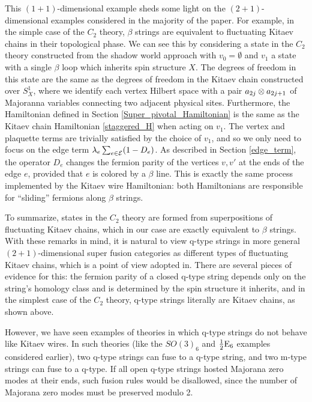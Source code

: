 This $(1+1)$-dimensional example sheds some light on the $(2+1)$-dimensional examples 
considered in the majority of the paper. For example, in the simple case of the $C_2$ theory, 
$\beta$ strings are equivalent to fluctuating Kitaev chains in their topological phase. 
We can see this by considering a state in the $C_2$ theory constructed 
from the shadow world approach with $v_0 = \emptyset$ and $v_1$ a state 
with a single $\beta$ loop which inherits spin structure $X$. 
The degrees of freedom in this state are the same as 
the degrees of freedom in the Kitaev chain constructed over $S^1_X$, 
where we identify each vertex Hilbert space with a pair $a_{2j}\otimes a_{2j+1}$ of Majoranna
variables connecting two adjacent physical sites. 
Furthermore, the Hamiltonian defined in Section \ref{Super_pivotal_Hamiltonian} is the same as the Kitaev 
chain Hamiltonian \eqref{staggered_H} when acting on $v_1$. 
The vertex and plaquette terms are trivially satisfied by the choice of $v_1$, and so we only need to focus 
on the edge term $\lambda_e \sum_{e\in \mathcal{E}} (1-D_e)$. As described in Section \ref{edge_term}, 
the operator $D_e$ changes the fermion parity of the vertices $v,v'$ at the ends of the edge $e$, provided
that $e$ is colored by a $\beta$ line. 
This is exactly the same process implemented by the Kitaev wire Hamiltonian: both Hamiltonians
 are responsible for ``sliding'' fermions along $\beta$ strings.  

To summarize, states in the $C_2$ theory are formed from superpositions of fluctuating Kitaev chains, which in our case are exactly equivalent to $\beta$ strings. 
With these remarks in mind, it 
is natural to view q-type strings in more general $(2+1)$-dimensional super fusion categories 
as different types of fluctuating Kitaev chains, which is a point of view adopted in\cite{tarantino2016,ware2016,kapustin2017}. 
There are several pieces of evidence for this: the fermion parity of a closed q-type string 
depends only on the string's homology class and is determined by the spin structure it inherits, 
and in the simplest case of the $C_2$ theory, q-type strings literally are Kitaev chains, as shown 
above. 

However, we have seen examples of theories in which q-type strings do not behave like Kitaev wires.
In such theories (like the $SO(3)_6$ and $\frac{1}{2}\text{E}_6$ examples considered earlier), two q-type
strings can fuse to a q-type string, and two m-type strings can fuse to a q-type. 
If all open q-type strings hosted Majorana zero modes at their ends, such fusion rules would 
be disallowed, since the number of Majorana zero modes must be preserved modulo 2. 






 
 